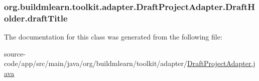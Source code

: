 \subsubsection[{\texorpdfstring{draft\+Title}{draftTitle}}]{ org.\+buildmlearn.\+toolkit.\+adapter.\+Draft\+Project\+Adapter.\+Draft\+Holder.\+draft\+Title}\hypertarget{classorg_1_1buildmlearn_1_1toolkit_1_1adapter_1_1DraftProjectAdapter_1_1DraftHolder_ade3eab0f132e524ac8987eb1233dfdb1}{}\label{classorg_1_1buildmlearn_1_1toolkit_1_1adapter_1_1DraftProjectAdapter_1_1DraftHolder_ade3eab0f132e524ac8987eb1233dfdb1}


The documentation for this class was generated from the following file\+:\begin{DoxyCompactItemize}
\item 
source-\/code/app/src/main/java/org/buildmlearn/toolkit/adapter/\hyperlink{DraftProjectAdapter_8java}{Draft\+Project\+Adapter.\+java}\end{DoxyCompactItemize}
